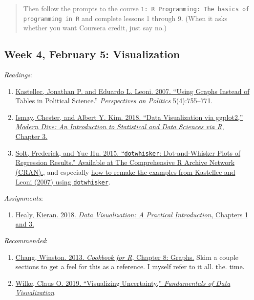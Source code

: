 \documentclass[]{article}
\providecommand{\tightlist}{%
  \setlength{\itemsep}{0pt}\setlength{\parskip}{0pt}}
\begin{document}
\begin{quote}
Then follow the prompts to the course
\texttt{1:~R Programming:~The basics of programming in R} and complete
lessons 1 through 9. (When it asks whether you want Coursera credit,
just say no.)
\end{quote}

\pagebreak

\hypertarget{week-4-february-5-visualization}{%
\subsection{Week 4, February 5:
Visualization}\label{week-4-february-5-visualization}}

\emph{Readings}:

\begin{enumerate}
\def\labelenumi{\arabic{enumi}.}
\tightlist
\item
  \href{http://dx.doi.org.proxy.lib.uiowa.edu/10.1017/S1537592707072209}{Kastellec,
  Jonathan P. and Eduardo L. Leoni. 2007. ``Using Graphs Instead of
  Tables in Political Science.'' \emph{Perspectives on Politics}
  5(4):755--771.}
\item
  \href{https://moderndive.com/3-viz.html}{Ismay, Chester, and Albert Y.
  Kim. 2018. ``Data Visualization via ggplot2,'' \emph{Modern Dive: An
  Introduction to Statistical and Data Sciences via R}, Chapter 3.}
\item
  \href{https://cran.r-project.org/web/packages/dotwhisker/vignettes/dotwhisker-vignette.html}{Solt,
  Frederick, and Yue Hu. 2015. ``\texttt{dotwhisker}: Dot-and-Whisker
  Plots of Regression Results.'' Available at The Comprehensive R
  Archive Network (CRAN).}, and especially
  \href{https://cran.r-project.org/web/packages/dotwhisker/vignettes/kl2007_examples.html}{how
  to remake the examples from Kastellec and Leoni (2007) using
  \texttt{dotwhisker}}.
\end{enumerate}

\emph{Assignments}:

\begin{enumerate}
\def\labelenumi{\arabic{enumi}.}
\tightlist
\item
  \href{https://socviz.co/lookatdata.html}{Healy, Kieran. 2018.
  \emph{Data Visualization: A Practical Introduction}, Chapters 1 and
  3.}
\end{enumerate}

\emph{Recommended}:

\begin{enumerate}
\def\labelenumi{\arabic{enumi}.}
\tightlist
\item
  \href{http://www.cookbook-r.com/Graphs/}{Chang, Winston. 2013.
  \emph{Cookbook for R}, Chapter 8: Graphs.} Skim a couple sections to
  get a feel for this as a reference. I myself refer to it all. the.
  time.
\item
  \href{https://serialmentor.com/dataviz/visualizing-uncertainty.html}{Wilke,
  Claus O. 2019. ``Visualizing Uncertainty,'' \emph{Fundamentals of Data
  Visualization}}
\end{enumerate}
\end{document}
